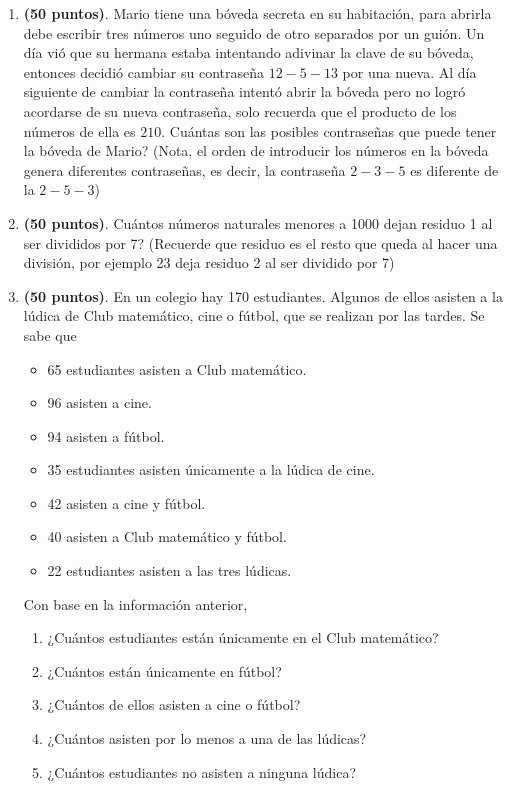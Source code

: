 \begin{enumerate}
	\item \textbf{(50 puntos)}. Mario tiene una bóveda secreta en su habitación, para abrirla debe escribir tres números uno seguido de otro separados por un guión. Un día vió que su hermana estaba intentando adivinar la clave de su bóveda, entonces decidió cambiar su contraseña $12-5-13$ por una nueva. Al día siguiente de cambiar la contraseña intentó abrir la bóveda pero no logró acordarse de su nueva contraseña, solo recuerda que el producto de los números de ella es $210$. Cuántas son las posibles contraseñas que puede tener la bóveda de Mario? (Nota, el orden de introducir los números en la bóveda genera diferentes contraseñas, es decir, la contraseña $2-3-5$ es diferente de la $2-5-3$)
			
	\item \textbf{(50 puntos)}. Cuántos números naturales menores a 1000 dejan residuo 1 al ser divididos por 7? (Recuerde que residuo es el resto que queda al hacer una división, por ejemplo 23 deja residuo 2 al ser dividido por 7)
			
	
	\item \textbf{(50 puntos)}. En un colegio hay 170 estudiantes. Algunos de ellos asisten a la lúdica de Club matemático,  cine o fútbol, que se realizan por las tardes. Se sabe que
			\begin{itemize}
				\item 65 estudiantes asisten a Club matemático.
				\item 96 asisten a cine.
				\item 94 asisten a fútbol.
				\item 35 estudiantes asisten únicamente a la lúdica de cine.
				\item 42 asisten a cine y fútbol.
				\item 40 asisten a Club matemático y fútbol.
				\item 22 estudiantes asisten a las tres lúdicas.
			\end{itemize}
			Con base en la información anterior,
			\begin{enumerate}
				\item ¿Cuántos estudiantes están únicamente en el Club matemático?
				\item ¿Cuántos están únicamente en fútbol?
				\item ¿Cuántos de ellos asisten a cine o fútbol?
				\item ¿Cuántos asisten por lo menos a una de las lúdicas?
				\item ¿Cuántos estudiantes no asisten a ninguna lúdica?
			\end{enumerate}


\end{enumerate}

